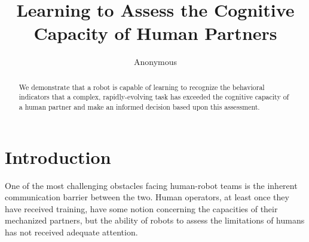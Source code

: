 \documentclass{sig-alternate}
\begin{document}
\title{Learning to Assess the Cognitive Capacity of Human Partners}


\author{
%
\alignauthor
Anonymous\\
}

\maketitle
\begin{abstract} 
We demonstrate that a robot is capable of learning to recognize the
behavioral indicators that a complex, rapidly-evolving task has exceeded
the cognitive capacity of a human partner and make an informed decision
based upon this assessment.
\end{abstract}




\section{Introduction}
One of the most challenging obstacles facing human-robot teams is the
inherent communication barrier between the two. Human operators, at
least once they have received training, have some notion concerning
the capacities of their mechanized partners, but the ability of robots
to assess the limitations of humans has not received adequate
attention.
\end{document}
